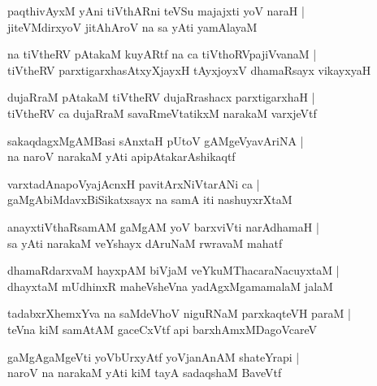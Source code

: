 \documentclass[twoside,12pt,openright]{book}
\newcounter{shloka}[chapter]
\begin{document}
\begin{shloka}
paqthivAyxM yAni tiVthARni teVSu majajxti yoV naraH |\\
jiteVMdirxyoV jitAhAroV na sa yAti yamAlayaM  
\end{shloka}

\begin{shloka}
na tiVtheRV pAtakaM kuyARtf na ca tiVthoRVpajiVvanaM |\\
tiVtheRV parxtigarxhasAtxyXjayxH tAyxjoyxV dhamaRsayx vikayxyaH 
\end{shloka}

\begin{shloka}
dujaRraM pAtakaM tiVtheRV dujaRrashacx parxtigarxhaH |\\
tiVtheRV ca dujaRraM savaRmeVtatikxM narakaM varxjeVtf 
\end{shloka}

\begin{shloka}
sakaqdagxMgAMBasi sAnxtaH pUtoV gAMgeVyavAriNA |\\
na naroV narakaM yAti  apipAtakarAshikaqtf 
\end{shloka}

\begin{shloka}
varxtadAnapoVyajAcnxH pavitArxNiVtarANi ca |\\
gaMgAbiMdavxBiSikatxsayx na samA iti nashuyxrXtaM
\end{shloka}

\begin{shloka}
anayxtiVthaRsamAM gaMgAM yoV barxviVti narAdhamaH |\\
sa yAti narakaM veYshayx dAruNaM rwravaM mahatf 
\end{shloka}

\begin{shloka}
dhamaRdarxvaM hayxpAM biVjaM veYkuMThacaraNacuyxtaM |\\
dhayxtaM mUdhinxR maheVsheVna yadAgxMgamamalaM jalaM 
\end{shloka}

\begin{shloka}
tadabxrXhemxYva na saMdeVhoV niguRNaM parxkaqteVH paraM |\\
teVna kiM samAtAM gaceCxVtf api barxhAmxMDagoVcareV 
\end{shloka}

\begin{shloka}
gaMgAgaMgeVti yoVbUrxyAtf yoVjanAnAM shateYrapi |\\
naroV na narakaM yAti kiM tayA sadaqshaM BaveVtf
\end{shloka}
\end{document}
